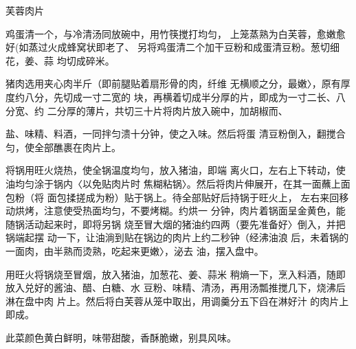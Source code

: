 \begin{recipe}{芙蓉肉片}

\ingredients



\cooking

\step 	鸡蛋清一个，与冷清汤同放碗中，用竹筷搅打均匀， 上笼蒸熟为白芙蓉，愈嫩愈好(如蒸过火成蜂窝状即老了、 另将鸡蛋清二个加干豆粉和成蛋清豆粉。葱切细花，姜、蒜 均切成碎米。

\step 	猪肉选用夹心肉半斤（即前腿贴着扇形骨的肉，纤维 无横顺之分，最嫩〉，原有厚度约八分，先切成一寸二宽的 块，再横着切成半分厚的片，即成为一寸二长、八分宽、约 二分厚的薄片，共切三十片将肉片放入碗中，加胡椒而、

盐、味精、料酒，一同拌匀溃十分钟，使之入味。然后将蛋 清豆粉倒入，翻搅合匀，使全部醮裹在肉片上。

\step 将锅用旺火烧热，使全锅温度均勻，放入猪油，即端 离火口，左右上下转动，使油均匀涂于锅内〈以免贴肉片时 焦糊粘锅〉。然后将肉片伸展开，在其一面蘸上面包粉（将 面包揉搓成为粉）贴于锅上。待全部贴好后持锅于旺火上， 左右来回移动烘烤，注意使受热面均匀，不要烤糊。约烘一 分钟，肉片着锅面呈金黄色，能随锅活动起来时，即将另锅 烧至冒大烟的猪油约四两（要先准备好〉倒入，并把锅端起摆 动一下，让油淌到贴在锅边的肉片上约二秒钟（经沸油浪 后，未着锅的一面肉，由半熟而烫熟，吃起来更嫩〉，泌去 油，摆入盘中。

\step 用旺火将锅烧至冒烟，放入猪油，加葱花、姜、蒜米 稍熵一下，烹入料酒，随即放入兑好的酱油、醋、白糖、水 豆粉、味精、清汤，再用汤瓢推搅几下，烧沸后淋在盘中肉 片上。然后将白芙蓉从笼中取出，用调羹分五下舀在淋好汁 的肉片上即成。

\notes

此菜颜色黄白鲜明，味带甜酸，香酥脆嫩，别具风味。

\end{recipe}

